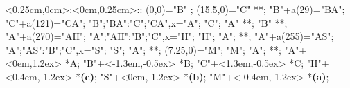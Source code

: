 %

\xy    <0.25cm,0cm>:<0cm,0.25cm>::
       (0,0)="B" ; (15.5,0)="C" **\dir{-}; 
       "B"+a(29)="BA"; "C"+a(121)="CA";
       {"B";"BA":"C";"CA",x}="A"; 
       "C"; "A" **\dir{-}; "B" **\dir{-};
       "A"+a(270)="AH"; {"A";"AH":"B";"C",x}="H";   "H"; "A"; **\dir{-};
       "A"+a(255)="AS"; {"A";"AS":"B";"C",x}="S";   "S"; "A"; **\dir{-};
       (7.25,0)="M";   "M"; "A"; **\dir{-};
	 "A"+<0em,1.2ex> *{A};
	 "B"+<-1.3em,-0.5ex> *{B};
	 "C"+<1.3em,-0.5ex> *{C};
	 "H"+<0.4em,-1.2ex> *{\bf\scriptstyle (c)};
	 "S"+<0em,-1.2ex> *{\bf\scriptstyle (b)};
	 "M"+<-0.4em,-1.2ex> *{\bf\scriptstyle (a)};
       \endxy%
